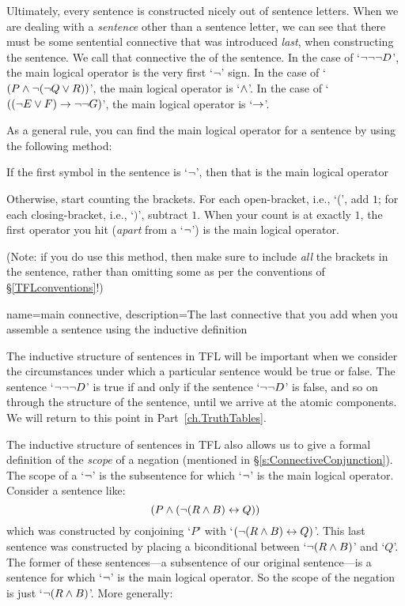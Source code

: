 Ultimately, every sentence is constructed nicely out of sentence letters. When we are dealing with a \emph{sentence} other than a sentence letter, we can see that there must be some sentential connective that was introduced \emph{last}, when constructing the sentence. We call that connective the  of the sentence. In the case of `$\neg\neg\neg D$', the main logical operator is the very first `$\neg$' sign. In the case of `$(P \wedge \neg (\neg Q \vee R))$', the main logical operator is `$\wedge$'. In the case of `$((\neg E \vee F) \rightarrow \neg\neg G)$', the main logical operator is `$\rightarrow$'.

As a general rule, you can find the main logical operator for a sentence by using the following method:
\begin{ebullet}
	\item If the first symbol in the sentence is `$\neg$', then that is the main logical operator
	\item Otherwise, start counting the brackets. For each open-bracket, i.e., `(', add $1$; for each closing-bracket, i.e., `$)$', subtract $1$. When your count is at exactly $1$, the first operator you hit (\emph{apart} from a `$\neg$') is the main logical operator.
\end{ebullet}

(Note: if you do use this method, then make sure to include \emph{all} the brackets in the sentence, rather than omitting some as per the conventions of \S\ref{TFLconventions}!)

{
name=main connective,
description={The last connective that you add when you assemble a sentence using the inductive definition}
}

The inductive structure of sentences in TFL will be important when we consider the circumstances under which a particular sentence would be true or false. The sentence `$\neg \neg \neg D$' is true if and only if the sentence `$\neg \neg D$' is false, and so on through the structure of the sentence, until we arrive at the atomic components. We will return to this point in Part~\ref{ch.TruthTables}.

The inductive structure of sentences in TFL also allows us to give a formal definition of the \emph{scope} of a negation (mentioned in \S\ref{s:ConnectiveConjunction}). The scope of a `$\neg$' is the subsentence for which `$\neg$' is the main logical operator. Consider a sentence like:
$$(P \wedge (\neg (R \wedge B) \leftrightarrow Q))$$
which was constructed by conjoining `$P$' with `$ (\neg (R \wedge B) \leftrightarrow Q)$'. This last sentence was constructed by placing a biconditional between `$\neg (R \wedge B)$' and `$Q$'. The former of these sentences---a subsentence of our original sentence---is a sentence for which `$\neg$' is the main logical operator. So the scope of the negation is just `$\neg(R \wedge B)$'. More generally:


